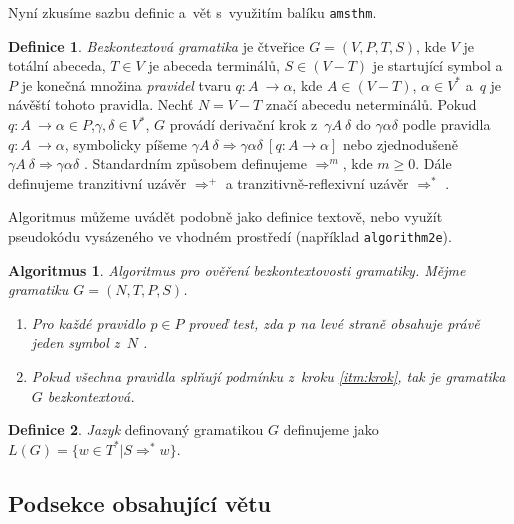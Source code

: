 \documentclass[11pt,a4paper,twocolumn,oneside]{article}
\theoremstyle{definition}
\newtheorem{definice}{Definice}[section]
\theoremstyle{plain}
\newtheorem{definice2}{Algoritmus}[section]
\theoremstyle{plain}
\begin{document}
Nyní zkusíme sazbu definic a~vět s~využitím balíku \verb|amsthm|.

	\begin{definice}	\label{definice_1_1} 
{\itshape Bezkontextová gramatika} je čtveřice $G=(V,P,T,S)$, kde $V$ je totální abeceda,
$T \in V$ je abeceda terminálů, $S \in (V-T)$ je startující symbol a $P$ je konečná množina {\itshape pravidel}
tvaru $q\!: A~\rightarrow \alpha$, kde $A \in (V-T) $, $\alpha \in V^*$ a~$q$ je návěští tohoto pravidla. Nechť $N=V-T$ značí abecedu neterminálů.
Pokud $q\!: A~\rightarrow \alpha \in P$,$\gamma,\delta \in V^*$, $G$ provádí derivační krok z~$\gamma A~\delta$ do $\gamma \alpha \delta$ podle pravidla $q\!: A~\rightarrow \alpha$, symbolicky píšeme $\gamma A~\delta \Rightarrow \gamma \alpha \delta \: [q\!:A \rightarrow \alpha]$ nebo zjednodušeně $\gamma A~\delta \Rightarrow \gamma \alpha \delta$ . Standardním způsobem definujeme $\Rightarrow^m$, kde $m \geq 0$. Dále definujeme 
tranzitivní uzávěr $\Rightarrow^+$ a tranzitivně-reflexivní uzávěr $\Rightarrow^*$ .
	\end{definice}

Algoritmus můžeme uvádět podobně jako definice textově, nebo využít pseudokódu vysázeného ve vhodném prostředí (například \verb|algorithm2e|).

	\setcounter{definice2}{1}
	\begin{definice2}
{\itshape Algoritmus pro ověření bezkontextovosti gramatiky. Mějme gramatiku $G=(N, T, P, S)$.

	\begin{enumerate}
 		\item \label{itm:krok} Pro každé pravidlo $p \in P$ proveď test, zda $p$ na levé straně obsahuje právě jeden symbol z~$N$ .
 		\item Pokud všechna pravidla splňují podmínku z~kroku \ref{itm:krok}, tak je gramatika $G$ bezkontextová.
	\end{enumerate} 
}
 	\end{definice2}
 
 	\setcounter{definice}{2}
	\begin{definice}
{\itshape Jazyk} definovaný gramatikou $G$ definujeme jako $L(G)=\{w \in T^*|S \Rightarrow^*w\}$.
	\end{definice}	
	
\subsection{Podsekce obsahující větu}
\end{document}
